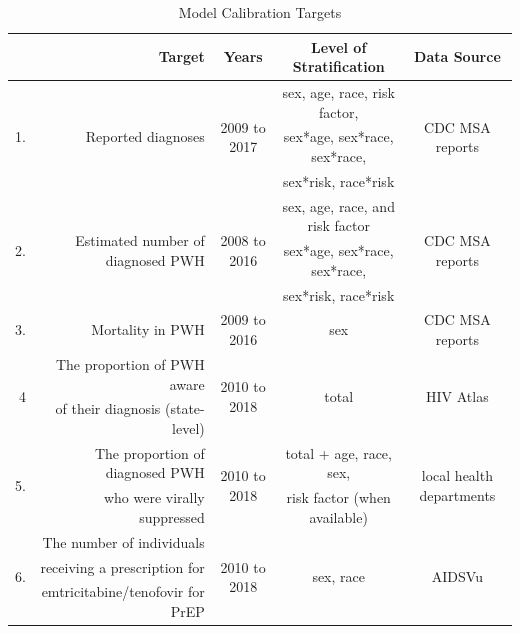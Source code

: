 \documentclass{article}
\begin{document}
\begin{table}[H]
	\caption{Model Calibration Targets}
	\small
	\begin{tabular}{r r c c c}
		\hline
		& \textbf{Target} & \textbf{Years} & \textbf{Level of Stratification} & \textbf{Data Source} \\
		\hline
		\hline
		
		\multirow{3}{*}{1.} & \multirow{3}{*}{Reported diagnoses} & \multirow{3}{*}{2009 to 2017} & sex, age, race, risk factor, & \multirow{3}{*}{CDC MSA reports \cite{hivatlas,msa2010,msa2011,msa2013,msa2014,msa2015,msa2016,cdc24.2} }\\
		& & & sex*age, sex*race, sex*race, & \\
		& & & sex*risk, race*risk & \\
		\hline
		
		\multirow{3}{*}{2.} & \multirow{3}{*}{Estimated number of diagnosed PWH} & \multirow{3}{*}{2008 to 2016} & sex, age, race, and risk factor & \multirow{3}{*}{CDC MSA reports \cite{hivatlas,msa2010,msa2011,msa2013,msa2014,msa2015,msa2016,cdc24.2} }\\
		& & & sex*age, sex*race, sex*race, & \\
		& & & sex*risk, race*risk & \\
		\hline
		
		3. & Mortality in PWH & 2009 to 2016 & sex & CDC MSA reports  \cite{msa2010,msa2011,msa2013,msa2014,msa2015,msa2016,cdc24.2} \\
		\hline
		
		\multirow{2}{*}{4}. & The proportion of PWH aware & \multirow{2}{*}{2010 to 2018} & \multirow{2}{*}{total} & \multirow{2}{*}{HIV Atlas \cite{hivatlas} }\\
		& of their diagnosis (state-level) & & & \\
		\hline
		
		\multirow{2}{*}{5.} & The proportion of diagnosed PWH & \multirow{2}{*}{2010 to 2018} & total + age, race, sex, & \multirow{2}{*}{local health departments} \\
		& who were virally suppressed & & risk factor (when available) & \\
		\hline
		
		\multirow{3}{*}{6.} & The number of individuals & \multirow{3}{*}{2010 to 2018} & \multirow{3}{*}{sex, race} & \multirow{3}{*}{AIDSVu \cite{aidsvu_prep} }\\
		& receiving a prescription for & & & \\
		& emtricitabine/tenofovir for PrEP & & & \\
		\hline
		

\end{tabular}
\end{table}
\end{document}
